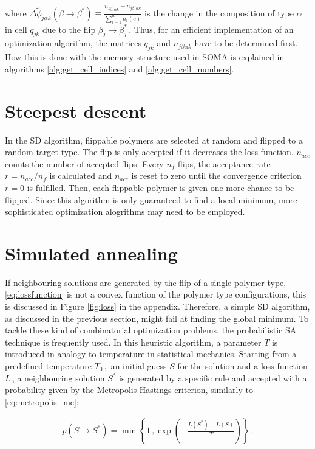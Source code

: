 \documentclass[bachelor,       %
               twoside,        %
               BCOR10mm,       %
               ngerman, english %
               ]{GAUBM}
\begin{document}
where $\Delta\tilde\phi_{ j\alpha k}(\beta\rightarrow\beta^*)\equiv\frac{n_{j\beta_j^*\alpha k}-n_{j\beta_j\alpha k}}{\sum_{i=1}^{n_t}n_i(c)}$ is the change in the composition of type $\alpha$ in cell $q_{jk}$ due to the flip $\beta_j\rightarrow\beta_j^*\,$. Thus, for an efficient implementation of an optimization algorithm, the matrices $q_{jk}$ and $n_{j\beta\alpha k}$ have to be determined first. How this is done with the memory structure used in \ac{SOMA} is explained in algorithms \ref{alg:get_cell_indices} and \ref{alg:get_cell_numbers}. 

\section{Steepest descent}

In the \ac{SD} algorithm, flippable polymers are selected at random and flipped to a random target type. The flip is only accepted if it decreases the loss function. $n_{acc}$ counts the number of accepted flips. Every $n_f$ flips, the acceptance rate $r=n_{acc}/n_f$ is calculated and $n_{acc}$ is reset to zero until the convergence criterion $r=0$ is fulfilled. Then, each flippable polymer is given one more chance to be flipped. Since this algorithm is only guaranteed to find a local minimum, more sophisticated optimization alogrithms may need to be employed.

\section{Simulated annealing}

If neighbouring solutions are generated by the flip of a single polymer type, \eqref{eq:lossfunction} is not a convex function of the polymer type configurations, this is discussed in Figure \ref{fig:loss} in the appendix. Therefore, a simple \ac{SD} algorithm, as discussed in the previous section, might fail at finding the global minimum. To tackle these kind of combinatorial optimization problems, the probabilistic \ac{SA} technique \cite{simulated_annealing} is frequently used. In this heuristic algorithm, a parameter $T$ is introduced in analogy to temperature in statistical mechanics. Starting from a predefined temperature $T_0\,,$ an initial guess $S$ for the solution and a loss function $L\,$, a neighbouring solution $S^*$ is generated by a specific rule and accepted with a probability given by the Metropolis-Hastings criterion, similarly to \eqref{eq:metropolis_mc}:

\begin{align}
    p(S\rightarrow S^*)=\min\left\{1\,,\exp\left(-\frac{L(S^*)-L(S)}{T}\right)\right\}\,.
\end{align}
\end{document}
